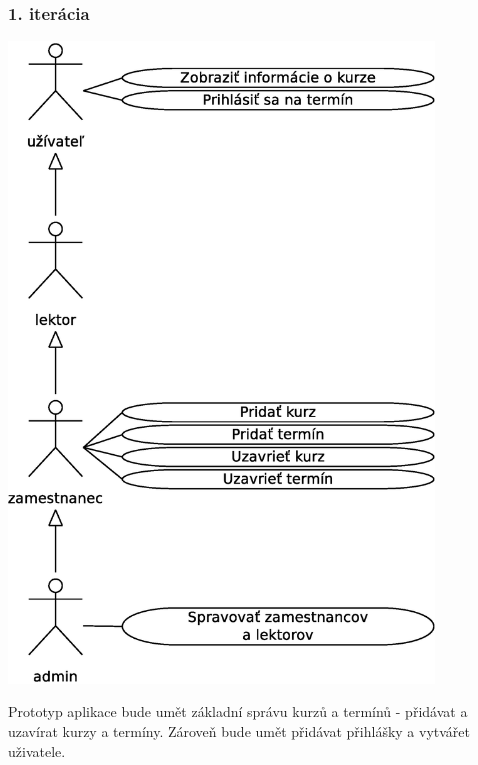 \documentclass[12pt,a4paper,titlepage,final]{report}
\begin{document}
	\subsubsection{1. iterácia}
		\begin{center}
			\captionsetup{type=figure}
			\includegraphics[height=17cm]{img/use_case_iter1.eps}
		\end{center}
		
Prototyp aplikace bude umět základní správu kurzů a termínů - přidávat a uzavírat kurzy a termíny. Zároveň bude umět přidávat přihlášky a vytvářet uživatele.
	
\end{document}
